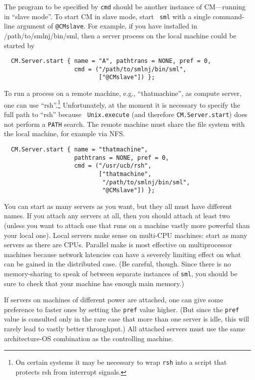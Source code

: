 \documentclass[titlepage,letterpaper]{article}
\begin{document}
The program to be specified by {\tt cmd} should be another instance of
CM---running in ``slave mode''.  To start CM in slave mode, start {\tt
sml} with a single command-line argument of {\tt @CMslave}.  For
example, if you have installed in /path/to/smlnj/bin/sml, then a
server process on the local machine could be started by

\begin{verbatim}
  CM.Server.start { name = "A", pathtrans = NONE, pref = 0,
                    cmd = ("/path/to/smlnj/bin/sml",
                           ["@CMslave"]) };
\end{verbatim}

To run a process on a remote machine, e.g., ``thatmachine'', as
compute server, one can use ``rsh''.\footnote{On certain systems it
may be necessary to wrap {\tt rsh} into a script that protects rsh
from interrupt signals.}  Unfortunately, at the moment it
is necessary to specify the full path to ``rsh'' because {\tt
Unix.execute} (and therefore {\tt CM.Server.start}) does not perform
a {\tt PATH} search. The remote machine
must share the file system with the local machine, for example via NFS.

\begin{verbatim}
  CM.Server.start { name = "thatmachine",
                    pathtrans = NONE, pref = 0,
                    cmd = ("/usr/ucb/rsh",
                           ["thatmachine",
                            "/path/to/smlnj/bin/sml",
                            "@CMslave"]) };
\end{verbatim}

You can start as many servers as you want, but they all must have
different names.  If you attach any servers at all, then you should
attach at least two (unless you want to attach one that runs on a
machine vastly more powerful than your local one).  Local servers make
sense on multi-CPU machines: start as many servers as there are CPUs.
Parallel make is most effective on multiprocessor machines because
network latencies can have a severely limiting effect on what can be
gained in the distributed case.
(Be careful, though.  Since there is no memory-sharing to speak of
between separate instances of {\tt sml}, you should be sure to check
that your machine has enough main memory.)

If servers on machines of different power are attached, one can give
some preference to faster ones by setting the {\tt pref} value higher.
(But since the {\tt pref} value is consulted only in the rare case
that more than one server is idle, this will rarely lead to vastly
better throughput.) All attached servers must use the same
architecture-OS combination as the controlling machine.
\end{document}
